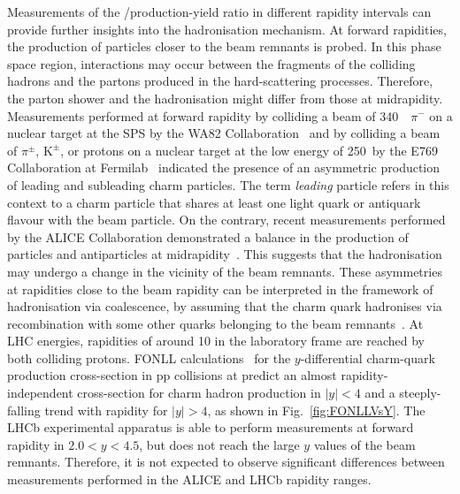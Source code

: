 Measurements of the \ds/\dpl production-yield ratio in different rapidity intervals can provide further insights into the hadronisation mechanism. At forward rapidities, the production of particles closer to the beam remnants is probed. In this phase space region, interactions may occur between the fragments of the colliding hadrons and the partons produced in the hard-scattering processes. Therefore, the parton shower and the hadronisation might differ from those at midrapidity. Measurements performed at forward rapidity by colliding a beam of 340~~\gevc $\pi^-$ on a nuclear target at the SPS by the WA82 Collaboration~\cite{WA82:1993ghz} and by colliding a beam of $\pi^\pm$, $\mathrm{K^\pm}$, or protons on a nuclear target at the low energy of 250~\gev by the E769 Collaboration at Fermilab~\cite{E769:1996jqf} indicated the presence of an asymmetric production of leading and subleading charm particles. The term \emph{leading} particle refers in this context to a charm particle that shares at least one light quark or antiquark flavour with the beam particle. On the contrary, recent measurements performed by the ALICE Collaboration demonstrated a balance in the production of particles and antiparticles at midrapidity~\cite{ALICE:2023ulv}. This suggests that the hadronisation may undergo a change in the vicinity of the beam remnants. These asymmetries at rapidities close to the beam rapidity can be interpreted in the framework of hadronisation via coalescence, by assuming that the charm quark hadronises via recombination with some other quarks belonging to the beam remnants~\cite{Norrbin:1998bw,Norrbin:2000zc}. At LHC energies, rapidities of around 10 in the laboratory frame are reached by both colliding protons. FONLL calculations~\cite{Cacciari:1998it} for the $y$-differential charm-quark production cross-section in pp collisions at \thirteen predict an almost rapidity-independent cross-section for charm hadron production in $\lvert y\rvert<4$ and a steeply-falling trend with rapidity for $\lvert y\rvert>4$, as shown in Fig.~\ref{fig:FONLLVsY}. The LHCb experimental apparatus is able to perform measurements at forward rapidity in $2.0<y<4.5$, but does not reach the large $y$ values of the beam remnants. Therefore, it is not expected to observe significant differences between measurements performed in the ALICE and LHCb rapidity ranges. 


